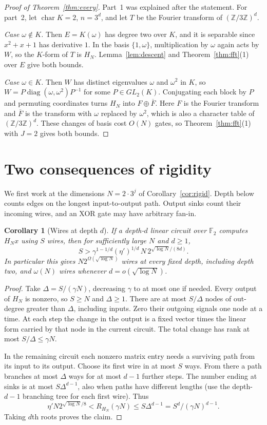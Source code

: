 \documentclass[11pt]{article}
\newtheorem{corollary}[theorem]{Corollary}
\theoremstyle{definition}
\theoremstyle{remark}
\newcommand{\F}{\mathbb{F}}
\newcommand{\Z}{\mathbb{Z}}
\begin{document}
\begin{proof}[Proof of Theorem~\ref{thm:every}]
Part~1 was explained after the statement. For part~2, let
$\operatorname{char}K=2$, $n=3^d$, and let $T$ be the Fourier transform of
$(\Z/3\Z)^d$.

\emph{Case $\omega\notin K$.} Then $E=K(\omega)$ has degree two over $K$,
and it is separable since $x^2+x+1$ has derivative $1$. In the basis
$\{1,\omega\}$, multiplication by $\omega$ again acts by $W$, so the
$K$-form of $T$ is $H_N$. Lemma~\ref{lem:descent} and
Theorem~\ref{thm:fft}(1) over $E$ give both bounds.

\emph{Case $\omega\in K$.} Then $W$ has distinct eigenvalues $\omega$ and
$\omega^2$ in $K$, so $W=P\operatorname{diag}(\omega,\omega^2)P^{-1}$ for
some $P\in GL_2(K)$. Conjugating each block by $P$ and permuting
coordinates turns $H_N$ into $F\oplus\overline F$. Here $F$ is the Fourier
transform and $\overline F$ is the transform with $\omega$ replaced by
$\omega^2$, which is also a character table of $(\Z/3\Z)^d$. These changes
of basis cost $O(N)$ gates, so Theorem~\ref{thm:fft}(1) with $J=2$ gives
both bounds.
\end{proof}

\section{Two consequences of rigidity}\label{sec:applications}
We first work at the dimensions $N=2\cdot3^j$ of
Corollary~\ref{cor:rigid}. Depth below counts edges on the longest
input-to-output path. Output sinks count their incoming wires, and
an XOR gate may have arbitrary fan-in.

\begin{corollary}[Wires at depth $d$]\label{cor:wires}
If a depth-$d$ linear circuit over $\F_2$ computes $H_Nx$ using $S$
wires, then for sufficiently large $N$ and $d\ge1$,
\[
 S>\gamma^{1-1/d}(\eta')^{1/d}\,N\,2^{\sqrt{\log N}/(8d)}.
\]
In particular this gives $N2^{\Omega(\sqrt{\log N})}$ wires at
every fixed depth, including depth two, and $\omega(N)$ wires
whenever $d=o(\sqrt{\log N})$.
\end{corollary}
\begin{proof}
Take $\Delta=S/(\gamma N)$, decreasing $\gamma$ to at most one if
needed. Every output of $H_N$ is nonzero, so $S\ge N$ and $\Delta\ge1$.
There are at most $S/\Delta$ nodes of out-degree greater than $\Delta$,
including inputs. Zero their outgoing signals one node at a time.
At each step the change in the output is a fixed vector times the
linear form carried by that node in the current circuit. The total
change has rank at most $S/\Delta\le\gamma N$.

In the remaining circuit each nonzero matrix entry needs a surviving
path from its input to its output. Choose its first wire in at most
$S$ ways. From there a path branches at most $\Delta$ ways for at
most $d-1$ further steps. The number ending at sinks is at most
$S\Delta^{d-1}$, also when paths have different lengths (use the
depth-$d-1$ branching tree for each first wire). Thus
\[
 \eta'N2^{\sqrt{\log N}/8}<R_{H_N}(\gamma N)
 \le S\Delta^{d-1}=S^d/(\gamma N)^{d-1}.
\]
Taking $d$th roots proves the claim.
\end{proof}
\end{document}
